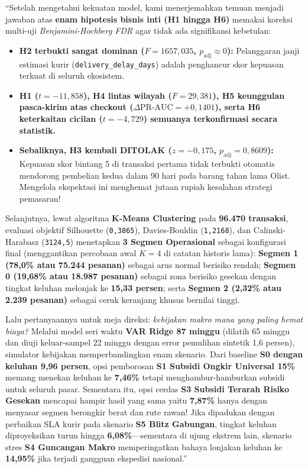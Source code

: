 \documentclass[11pt,a4paper,oneside]{book}
\newcommand{\code}[1]{{\small\nolinkurl{#1}}}
\begin{document}
\begin{scriptbox}
``Setelah mengetahui kekuatan model, kami menerjemahkan temuan menjadi jawaban atas \textbf{enam hipotesis bisnis inti (H1 hingga H6)} memakai koreksi multi-uji \emph{Benjamini-Hochberg FDR} agar tidak ada signifikansi kebetulan:
\begin{itemize}
  \item \textbf{H2 terbukti sangat dominan ($F = 1657{,}035$, $p_{\text{adj}} \approx 0$):} Pelanggaran janji estimasi kurir (\code{delivery_delay_days}) adalah penghancur skor kepuasan terkuat di seluruh ekosistem.
  \item \textbf{H1 ($t = -11{,}858$), H4 lintas wilayah ($F = 29{,}381$), H5 keunggulan pasca-kirim atas checkout ($\Delta\text{PR-AUC} = +0{,}1401$), serta H6 keterkaitan cicilan ($t = -4{,}729$) semuanya terkonfirmasi secara statistik.}
  \item \textbf{Sebaliknya, H3 kembali DITOLAK ($z = -0{,}175$, $p_{\text{adj}} = 0{,}8609$):} Kepuasan skor bintang 5 di transaksi pertama tidak terbukti otomatis mendorong pembelian kedua dalam 90 hari pada barang tahan lama Olist. Mengelola ekspektasi ini menghemat jutaan rupiah kesalahan strategi pemasaran!
\end{itemize}

Selanjutnya, lewat algoritma \textbf{K-Means Clustering} pada \textbf{96.470 transaksi}, evaluasi objektif Silhouette (\code{0,3865}), Davies-Bouldin (\code{1,2168}), dan Calinski-Harabasz (\code{3124,5}) menetapkan \textbf{3 Segmen Operasional} sebagai konfigurasi final (menggantikan percobaan awal $K=4$ di catatan historis lama): \textbf{Segmen 1 (78,0\% atau 75.244 pesanan)} sebagai arus normal berisiko rendah; \textbf{Segmen 0 (19,68\% atau 18.987 pesanan)} sebagai zona berisiko gesekan dengan tingkat keluhan melonjak ke \textbf{15,33 persen}; serta \textbf{Segmen 2 (2,32\% atau 2.239 pesanan)} sebagai ceruk keranjang khusus bernilai tinggi.

Lalu pertanyaannya untuk meja direksi: \emph{kebijakan makro mana yang paling hemat biaya?} Melalui model seri waktu \textbf{VAR Ridge 87 minggu} (dilatih 65 minggu dan diuji keluar-sampel 22 minggu dengan error pemulihan sintetik 1,6 persen), simulator kebijakan memperbandingkan enam skenario. Dari baseline \textbf{S0 dengan keluhan 9,96 persen}, opsi pemborosan \textbf{S1 Subsidi Ongkir Universal 15\%} memang menekan keluhan ke \textbf{7,46\%} tetapi menghambur-hamburkan subsidi untuk seluruh pasar. Sementara itu, opsi cerdas \textbf{S3 Subsidi Terarah Risiko Gesekan} mencapai hampir hasil yang sama yaitu \textbf{7,87\%} hanya dengan menyasar segmen berongkir berat dan rute rawan! Jika dipadukan dengan perbaikan SLA kurir pada skenario \textbf{S5 Blitz Gabungan}, tingkat keluhan diproyeksikan turun hingga \textbf{6,08\%}---sementara di ujung ekstrem lain, skenario stres \textbf{S4 Guncangan Makro} memperingatkan bahaya lonjakan keluhan ke \textbf{14,95\%} jika terjadi gangguan ekspedisi nasional.''
\end{scriptbox}
\end{document}
